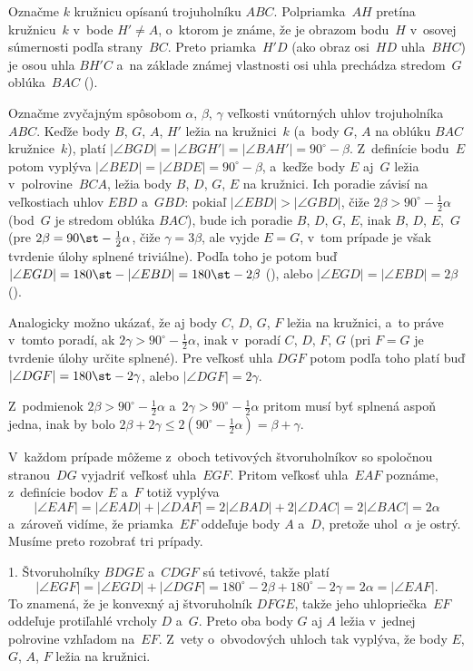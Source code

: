 {%
Označme $k$ kružnicu opísanú trojuholníku $ABC$.
Polpriamka~$AH$ pretína kružnicu~$k$ v~bode $H'\ne A$, o~ktorom je
známe, že je obrazom bodu~$H$ v~osovej súmernosti podľa strany~$BC$.
Preto priamka~$H'D$ (ako obraz osi~$HD$ uhla~$BHC$)
je osou uhla $BH'C$ a~na základe známej vlastnosti
osi uhla prechádza stredom~$G$ oblúka~$BAC$ (\obr).

Označme zvyčajným spôsobom $\alpha$, $\beta$, $\gamma$ veľkosti vnútorných
uhlov trojuholníka $ABC$.
Keďže body $B$, $G$, $A$, $H'$ ležia na kružnici~$k$ (a~body $G$, $A$
na oblúku $BAC$ kružnice~$k$),
platí $|\angle BGD| =|\angle BGH'| = |\angle BAH'| = 90^\circ-\beta$.
Z~definície bodu~$E$ potom vyplýva $|\angle BED| =|\angle BDE| = 90^\circ-\beta$,
a~keďže body $E$ aj~$G$ ležia v~polrovine~$BCA$, ležia body $B$, $D$, $G$, $E$
na kružnici. Ich poradie závisí na veľkostiach uhlov $EBD$ a~$GBD$:
pokiaľ $|\angle EBD| > |\angle GBD|$, čiže
$2 \beta> 90^\circ-\frac12\alpha$ (bod~$G$ je stredom oblúka $BAC$), bude ich poradie
$B$, $D$, $G$, $E$, inak $B$, $D$, $E$,~$G$ (pre $2\beta=90\st-\frac12\alpha$,
čiže $\gamma=3\beta$, ale vyjde $E=G$, v~tom prípade je však
tvrdenie úlohy splnené triviálne). Podľa toho je potom buď
$|\angle EGD|=180\st-|\angle EBD|=180\st-2\beta$ (),
alebo $|\angle EGD|=|\angle EBD|=2\beta$
(\obr).
%

Analogicky možno ukázať, že aj body $C$, $D$, $G$, $F$ ležia na kružnici,
a~to práve v~tomto poradí, ak $2\gamma> 90^\circ-\frac12\alpha$, inak
v~poradí $C$, $D$, $F$, $G$ (pri $F=G$ je tvrdenie úlohy určite splnené).
Pre veľkosť uhla $DGF$ potom podľa toho platí buď
$|\angle DGF|=180\st-2\gamma$, alebo $|\angle DGF|=2\gamma$.

Z~podmienok $2\beta> 90^\circ-\frac12\alpha$
a~$2\gamma> 90^\circ-\frac12\alpha$ pritom musí byť splnená aspoň jedna, inak
by bolo $2\beta+2\gamma \le 2({90^\circ-\frac12\alpha})=\beta+\gamma$.

V~každom prípade môžeme z~oboch tetivových štvoruholníkov so spoločnou stranou~$DG$
vyjadriť veľkosť uhla~$EGF$. Pritom veľkosť uhla~$EAF$ poznáme, z~definície
bodov $E$ a~$F$ totiž vyplýva
$$
|\angle EAF|=|\angle EAD|+|\angle DAF| = 2|\angle BAD|+2|\angle DAC| = 2|\angle BAC| = 2\alpha
$$
a~zároveň vidíme, že priamka~$EF$ oddeľuje body $A$ a~$D$, pretože uhol~$\alpha$ je ostrý.
Musíme preto rozobrať tri prípady.

1. Štvoruholníky $BDGE$ a~$CDGF$ sú tetivové, takže platí
$$
|\angle EGF|=|\angle EGD|+|\angle DGF| = 180^\circ-2 \beta+180^\circ-2 \gamma = 2\alpha
= |\angle EAF|.
$$
To znamená, že je konvexný
aj štvoruholník $DFGE$, takže jeho uhlopriečka~$EF$ oddeľuje protiľahlé vrcholy $D$ a~$G$.
Preto oba body $G$ aj $A$ ležia v~jednej polrovine vzhľadom
na~$EF$. Z~vety o~obvodových uhloch tak vyplýva, že body $E$, $G$, $A$,
$F$ ležia na kružnici.

}
